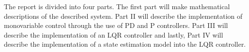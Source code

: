 The report is divided into four parts. The first part will make mathematical descriptions of the described system. Part II will describe the implementation of monovariable control through the use of PD and P controllers. Part III will describe the implementation of an LQR controller and lastly, Part IV will describe the implementation of a state estimation model into the LQR controller.